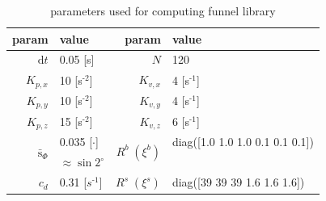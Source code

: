 \documentclass[letterpaper, 10 pt, conference]{ieeeconf}  %
\begin{document}
\begin{table}[b]
\begin{center}
\begin{tabular}{|r|l||r|l|} 
\hline
param & value & param & value \\ \hline \hline
$\text{d}t$ & 0.05 [s] & $N$ & 120 \\ \hline
$K_{p,x}$ & 10 [s$^\text{-2}$] & $K_{v,x}$ & 4 [s$^\text{-1}$] \\ \hline
$K_{p,y}$ & 10 [s$^\text{-2}$] & $K_{v,y}$ & 4 [s$^\text{-1}$] \\ \hline
$K_{p,z}$ & 15 [s$^\text{-2}$] & $K_{v,z}$ & 6 [s$^\text{-1}$] \\ \hline
\multirow{2}{*}{$\bar{\text{s}}_\Phi$} & 0.035 [$\cdot$] & \multirow{2}{*}{$R^b\;(\xi^b)$} & diag([1.0 1.0 1.0 0.1 0.1 0.1]) \\ 
& $\approx\sin2^\circ$ & & \;\;\;\;\;\;\;\;\;\;\;\;\;\;\;\;\;\;\;\;\;\;\;\; \\ \hline
$c_d$ & 0.31 [$s^\text{-1}$]                         & $R^s\;(\xi^s)$ & diag([39 39 39 1.6 1.6 1.6]) \\ \hline
\end{tabular}
\caption{parameters used for computing funnel library} \label{table:settings} 
\end{center}
\end{table}
\end{document}
